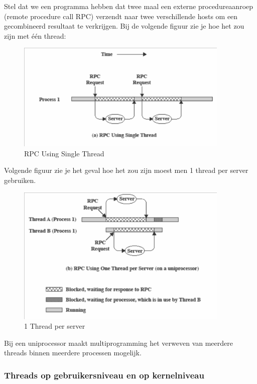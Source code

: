 Stel dat we een programma hebben dat twee maal een externe procedureaanroep (remote procedure call RPC) verzendt naar twee verschillende hosts om een gecombineerd resultaat te verkrijgen. Bij de volgende figuur zie je hoe het zou zijn met één thread:



\begin{figure}[htp]
    \centering
            \includegraphics[width=4in]{img/rpcsinglethread.png}
        \caption{RPC Using Single Thread}
    \label{fig:RPC Using Single Thread}
\end{figure}

Volgende figuur zie je het geval hoe het zou zijn moest men 1 thread per server gebruiken.

\begin{figure}[htp]
    \centering
            \includegraphics[width=4in]{img/threadperserver.png}
        \caption{1 Thread per server}
    \label{fig:1 Thread per server}
\end{figure}

Bij een uniprocessor maakt multiprogramming het verweven van meerdere threads binnen meerdere processen mogelijk.

\subsubsection{Threads op gebruikersniveau en op kernelniveau}

